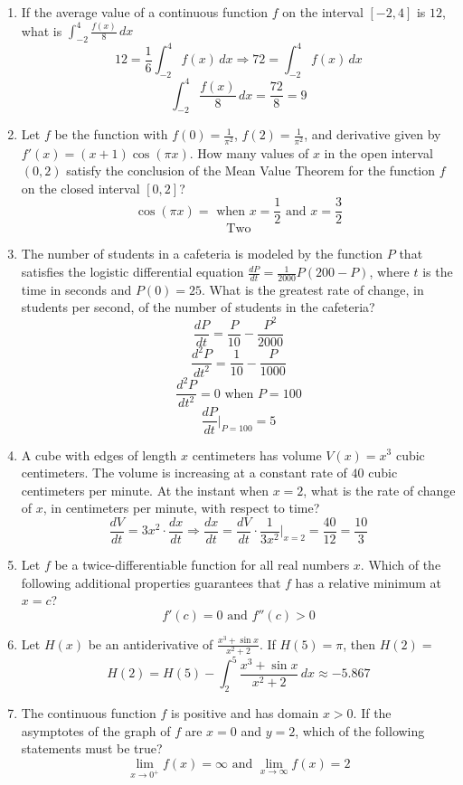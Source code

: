 \documentclass[12pt]{article}
\begin{document}
\begin{enumerate}
    \item If the average value of a continuous function $f$ on the interval $[-2, 4 ]$ is $12$, what is $\int_{-2}^{4} \frac{f(x)}{8} \, dx$
    $$12 = \frac{1}{6} \int_{-2}^{4} f(x) \, dx \Longrightarrow 72 = \int_{-2}^{4} f(x) \, dx$$
    $$\int_{-2}^{4} \frac{f(x)}{8} \, dx = \frac{72}{8} =\boxed{9}$$
    \item Let $f$ be the function with $f(0)=\frac{1}{\pi^2}$, $f(2)=\frac{1}{\pi^2}$, and derivative given by $f'(x)=(x+1)\cos(\pi x)$. How many values of $x$ in the open interval $(0, 2)$ satisfy the conclusion of the Mean Value Theorem for the function $f$ on the closed interval $[0, 2]$?
    $$\cos(\pi x) = \text{ when } x = \frac{1}{2} \text{ and } x= \frac{3}{2}$$
    $$\boxed{\text{Two}}$$
    \item The number of students in a cafeteria is modeled by the function $P$ that satisfies the logistic differential equation $\frac{dP}{dt}=\frac{1}{2000}P(200-P)$, where $t$ is the time in seconds and $P(0) = 25$. What is the greatest rate of change, in students per second, of the number of students in the cafeteria?
    $$\frac{dP}{dt}= \frac{P}{10}-\frac{P^2}{2000}$$
    $$\frac{d^2P}{dt^2} = \frac{1}{10}-\frac{P}{1000}$$
    $$\frac{d^2P}{dt^2} = 0 \text{ when } P=100$$
    $$\frac{dP}{dt}\bigg\rvert_{P=100} = \boxed{5}$$
    \item A cube with edges of length $x$ centimeters has volume $V(x) = x^3$ cubic centimeters. The volume is increasing at a constant rate of $40$ cubic centimeters per minute. At the instant when $x = 2$, what is the rate of change of $x$, in centimeters per minute, with respect to time?
    $$\frac{dV}{dt}= 3x^2 \cdot \frac{dx}{dt} \Longrightarrow \frac{dx}{dt} = \frac{dV}{dt} \cdot \frac{1}{3x^2}\biggr\rvert_{x=2}= \frac{40}{12} = \boxed{\frac{10}{3}}$$
    \item Let $f$ be a twice-differentiable function for all real numbers $x$. Which of the following additional properties guarantees that $f$ has a relative minimum at $x = c$?
    $$\boxed{f'(c) = 0 \text{ and } f''(c) > 0}$$
    \item Let $H(x)$ be an antiderivative of $\frac{x^3+\sin x}{x^2+2}$. If $H(5) = \pi$, then $H(2) =$
    $$H(2) = H(5)-\int_{2}^{5} \frac{x^3+\sin x}{x^2+2} \, dx \approx \boxed{-5.867}$$
    \item The continuous function $f$ is positive and has domain $x > 0$. If the asymptotes of the graph of $f$ are $x = 0$ and $y = 2$, which of the following statements must be true?
    $$\boxed{\lim_{x\to 0^{+}}f(x)= \infty \text{ and } \lim_{x\to\infty} f(x) = 2}$$

\end{enumerate}
\end{document}
